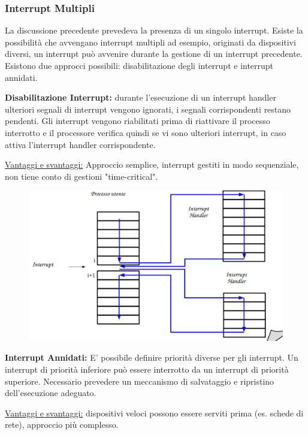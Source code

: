 \subsubsection{Interrupt Multipli}
 La discussione precedente prevedeva la presenza di un singolo
interrupt.
Esiste la possibilità che avvengano interrupt multipli ad esempio, originati da dispositivi diversi, un interrupt può avvenire durante la gestione di un interrupt precedente.
\newline
Esistono due approcci possibili: disabilitazione degli interrupt e interrupt annidati.
\newline

\textbf{Disabilitazione Interrupt:}
durante l'esecuzione di un interrupt handler ulteriori segnali di interrupt vengono ignorati, i segnali corrispondenti restano pendenti. Gli interrupt vengono riabilitati prima di riattivare il processo interrotto e il processore verifica quindi se vi sono ulteriori interrupt, in caso attiva l'interrupt handler corrispondente.
\newline

\underline{Vantaggi e svantaggi:}
\newline
Approccio semplice, interrupt gestiti in modo sequenziale,  non tiene conto di gestioni "time-critical".

\begin{figure} [h]
    \centering
    \includegraphics[width=0.7\linewidth]{Images/Screenshot 2024-12-16 140040.png}
    \label{fig:enter-label}
\end{figure}

\textbf{Interrupt Annidati:}
E' possibile definire priorità diverse per gli interrupt. Un interrupt di priorità inferiore può essere interrotto da un interrupt di priorità superiore. Necessario prevedere un meccanismo di salvataggio e ripristino dell'esecuzione adeguato.
\newline

\underline{Vantaggi e svantaggi:}
\newline
dispositivi veloci possono essere serviti prima (es. schede di rete), approccio più complesso.

